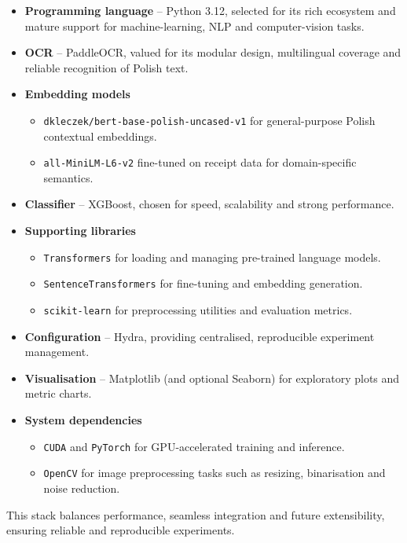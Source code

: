 \documentclass{SGGW-thesis-EN}
\begin{document}
\begin{itemize}
  \item \textbf{Programming language} – Python 3.12, selected for its rich ecosystem and mature support for machine-learning,
        NLP and computer-vision tasks.
  \item \textbf{OCR} – PaddleOCR, valued for its modular design, multilingual coverage and reliable recognition of Polish text.
  \item \textbf{Embedding models}
        \begin{itemize}
          \item \texttt{dkleczek/bert-base-polish-uncased-v1} for general-purpose Polish \newline contextual embeddings.
          \item \texttt{all-MiniLM-L6-v2} fine-tuned on receipt data for domain-specific semantics.
        \end{itemize}
  \item \textbf{Classifier} – XGBoost, chosen for speed, scalability and strong performance.
  \item \textbf{Supporting libraries}
        \begin{itemize}
          \item \texttt{Transformers} for loading and managing pre-trained language models.
          \item \texttt{SentenceTransformers} for fine-tuning and embedding generation.
          \item \texttt{scikit-learn} for preprocessing utilities and evaluation metrics.
        \end{itemize}
  \item \textbf{Configuration} – Hydra, providing centralised, reproducible experiment management.
  \item \textbf{Visualisation} – Matplotlib (and optional Seaborn) for exploratory plots and metric charts.
  \item \textbf{System dependencies}
        \begin{itemize}
          \item \texttt{CUDA} and \texttt{PyTorch} for GPU-accelerated training and inference.
          \item \texttt{OpenCV} for image preprocessing tasks such as resizing, binarisation and noise reduction.
        \end{itemize}
\end{itemize}

This stack balances performance, seamless integration and future extensibility, ensuring reliable and reproducible
experiments.
\end{document}
